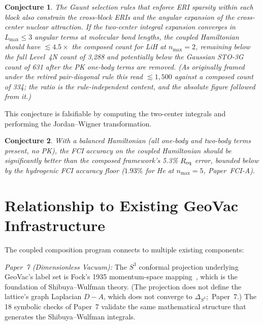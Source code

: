 \documentclass[aps,pra,twocolumn,superscriptaddress,longbibliography]{revtex4-2}
\newtheorem{conjecture}{Conjecture}
\begin{document}
\begin{conjecture}
\label{conj:sparsity}
The Gaunt selection rules that enforce ERI sparsity within each block
also constrain the cross-block ERIs and the angular expansion of the
cross-center nuclear attraction.  If the two-center integral expansion
converges in $L_{\max} \le 3$ angular terms at molecular bond lengths,
the coupled Hamiltonian should have $\lesssim 4.5\times$ the composed
count for LiH at $n_{\max} = 2$, remaining below the full Level~4N
count of 3{,}288 and potentially below the Gaussian STO-3G count of 631
after the PK one-body terms are removed.  (As originally framed under
the retired pair-diagonal rule this read $\lesssim 1{,}500$ against a
composed count of 334; the \emph{ratio} is the rule-independent
content, and the absolute figure followed from it.)
\end{conjecture}

This conjecture is falsifiable by computing the two-center integrals
and performing the Jordan--Wigner transformation.

\begin{conjecture}
\label{conj:accuracy}
With a balanced Hamiltonian (all one-body and two-body terms present,
no PK), the FCI accuracy on the coupled Hamiltonian should be
significantly better than the composed framework's 5.3\% $R_{\rm eq}$
error, bounded below by the hydrogenic FCI accuracy floor
($1.93\%$ for He at $n_{\max} = 5$, Paper~FCI-A).
\end{conjecture}


\section{Relationship to Existing GeoVac Infrastructure}
\label{sec:infrastructure}

The coupled composition program connects to multiple existing
components:

\emph{Paper~7 (Dimensionless Vacuum):} The $S^3$ conformal projection
underlying GeoVac's label set is Fock's 1935 momentum-space
mapping~\cite{fock1935}, which is the foundation of Shibuya--Wulfman
theory.  (The projection does not define the lattice's graph
Laplacian $D-A$, which does not converge to $\Delta_{S^3}$;\ Paper~7.)  The 18 symbolic checks of Paper~7
validate the same mathematical structure that generates the
Shibuya--Wulfman integrals.
\end{document}
